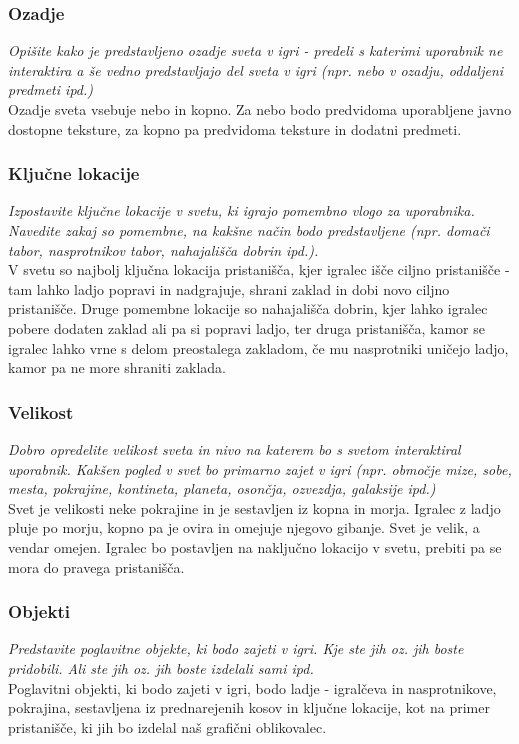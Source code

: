 \documentclass[a4paper]{article}
\begin{document}
\subsubsection{Ozadje}
\textit{Opišite kako je predstavljeno ozadje sveta v igri - predeli s katerimi uporabnik ne interaktira a še vedno predstavljajo del sveta v igri (npr. nebo v ozadju, oddaljeni predmeti ipd.)\\
}
Ozadje sveta vsebuje nebo in kopno. Za nebo bodo predvidoma uporabljene javno dostopne teksture, za kopno pa predvidoma teksture in dodatni predmeti.

\subsubsection{Ključne lokacije}
\textit{Izpostavite ključne lokacije v svetu, ki igrajo pomembno vlogo za uporabnika. Navedite zakaj so pomembne, na kakšne način bodo predstavljene (npr. domači tabor, nasprotnikov tabor, nahajališča dobrin  ipd.).\\
}
V svetu so najbolj ključna lokacija pristanišča, kjer igralec išče ciljno pristanišče - tam lahko ladjo popravi in nadgrajuje, shrani zaklad in dobi novo ciljno pristanišče. Druge pomembne lokacije so nahajališča dobrin, kjer lahko igralec pobere dodaten zaklad ali pa si popravi ladjo, ter druga pristanišča, kamor se igralec lahko vrne s delom preostalega zakladom, če mu nasprotniki uničejo ladjo, kamor pa ne more shraniti zaklada.

\subsubsection{Velikost}
\textit{Dobro opredelite velikost sveta in nivo na katerem bo s svetom interaktiral uporabnik. Kakšen pogled v svet bo primarno zajet v igri (npr. območje mize, sobe, mesta, pokrajine, kontineta, planeta, osončja, ozvezdja, galaksije ipd.)\\
}
Svet je velikosti neke pokrajine in je sestavljen iz kopna in morja. Igralec z ladjo pluje po morju, kopno pa je ovira in omejuje njegovo gibanje. Svet je velik, a vendar omejen. Igralec bo postavljen na naključno lokacijo v svetu, prebiti pa se mora do pravega pristanišča. 

\subsubsection{Objekti}
\textit{Predstavite poglavitne objekte, ki bodo zajeti v igri. Kje ste jih oz. jih boste pridobili. Ali ste jih oz. jih boste izdelali sami ipd.\\
}
Poglavitni objekti, ki bodo zajeti v igri, bodo ladje - igralčeva in nasprotnikove, pokrajina, sestavljena iz prednarejenih kosov in ključne lokacije, kot na primer pristanišče, ki jih bo izdelal naš grafični oblikovalec.
\end{document}
